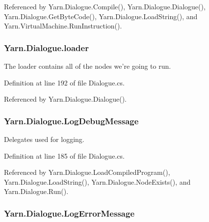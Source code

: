 Referenced by Yarn.\-Dialogue.\-Compile(), Yarn.\-Dialogue.\-Dialogue(), Yarn.\-Dialogue.\-Get\-Byte\-Code(), Yarn.\-Dialogue.\-Load\-String(), and Yarn.\-Virtual\-Machine.\-Run\-Instruction().

\hypertarget{a00082_a98bbe0ac2ccadeeeb7e05e3e6e19f2e0}{
\subsubsection[{loader}]{ Yarn.\-Dialogue.\-loader\hspace{0.3cm}{\ttfamily [package]}}}\label{a00082_a98bbe0ac2ccadeeeb7e05e3e6e19f2e0}


The loader contains all of the nodes we're going to run. 



Definition at line 192 of file Dialogue.\-cs.



Referenced by Yarn.\-Dialogue.\-Dialogue().

\hypertarget{a00082_a381f48bb0fbb294f8cf44ca57f11be31}{
\subsubsection[{Log\-Debug\-Message}]{ Yarn.\-Dialogue.\-Log\-Debug\-Message}}\label{a00082_a381f48bb0fbb294f8cf44ca57f11be31}


Delegates used for logging. 



Definition at line 185 of file Dialogue.\-cs.



Referenced by Yarn.\-Dialogue.\-Load\-Compiled\-Program(), Yarn.\-Dialogue.\-Load\-String(), Yarn.\-Dialogue.\-Node\-Exists(), and Yarn.\-Dialogue.\-Run().

\hypertarget{a00082_a9801e83dd044d6498fdf6ebcc6bec5ac}{
\subsubsection[{Log\-Error\-Message}]{ Yarn.\-Dialogue.\-Log\-Error\-Message}}\label{a00082_a9801e83dd044d6498fdf6ebcc6bec5ac}


